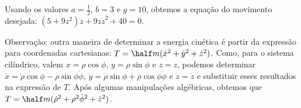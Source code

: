 \begin{question}
\begin{solution}
		Usando os valores $a = \frac{1}{2}$, $b = 3$ e $g = 10$, obtemos a equação do movimento desejada: %
		$(5 + 9z^2)\ddot z + 9z\dot z^2 + 40 = 0$. %

		Observação: outra maneira de determinar a energia cinética é partir da expressão para coordenadas cartesianas: $T = \half m (\dot x^2 + \dot y^2 + \dot z^2)$.
		Como, para o sistema cilíndrico, valem $x = \rho\cos\phi$, $y = \rho\sin\phi$ e $z = z$, podemos determinar $\dot x = \dot\rho \cos\phi - \rho\sin\phi \dot \phi$, $\dot y = \dot\rho \sin\phi + \rho\cos\phi \dot \phi$ e $\dot z = \dot z$ e substituir esses resultados na expressão de $T$. Após algumas manipulações algébricas, obtemos que $T = \half m (\dot\rho^2 + \rho^2\dot\phi^2 + \dot z^2)$. 
	\end{solution}
\end{question}